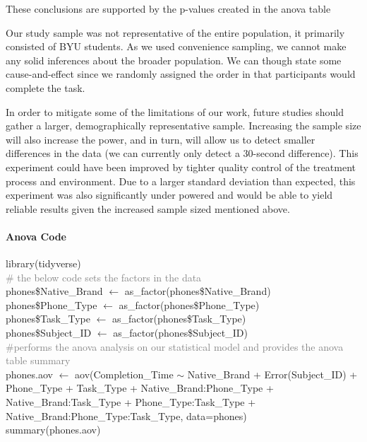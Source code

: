 \documentclass[conference]{IEEEtran}
\begin{document}
These conclusions are supported by the p-values created in the anova table

Our study sample was not representative of the entire population, it primarily consisted of BYU students. As we used convenience sampling, we cannot make any solid inferences about the broader population. We can though state some cause-and-effect since we randomly assigned the order in that participants would complete the task.  

In order to mitigate some of the limitations of our work, future studies should gather a larger, demographically representative sample. Increasing the sample size will also increase the power, and in turn, will allow us to detect smaller differences in the data (we can currently only detect a 30-second difference). This experiment could have been improved by tighter quality control of the treatment process and environment. Due to a larger standard deviation than expected, this experiment was also significantly under powered and would be able to yield reliable results given the increased sample sized mentioned above.

\onecolumn
\appendix
\paragraph{Anova Code}
\hfill\break \noindent library(tidyverse)\\
\textcolor{gray}{\# the below code sets the factors in the data} \\
\noindent phones\$Native\_Brand $\leftarrow$ as\_factor(phones\$Native\_Brand)\\
phones\$Phone\_Type $\leftarrow$ as\_factor(phones\$Phone\_Type)\\
phones\$Task\_Type $\leftarrow$ as\_factor(phones\$Task\_Type)\\
phones\$Subject\_ID $\leftarrow$ as\_factor(phones\$Subject\_ID)\\

\noindent \textcolor{gray}{\#performs the anova analysis on our statistical model and provides the anova table summary}\\
\noindent phones.aov $\leftarrow$ aov(Completion\_Time $\sim$ Native\_Brand + Error(Subject\_ID) + Phone\_Type + Task\_Type + Native\_Brand:Phone\_Type 
                  + Native\_Brand:Task\_Type + Phone\_Type:Task\_Type + Native\_Brand:Phone\_Type:Task\_Type, data=phones)\\ 
summary(phones.aov)\\
\end{document}
